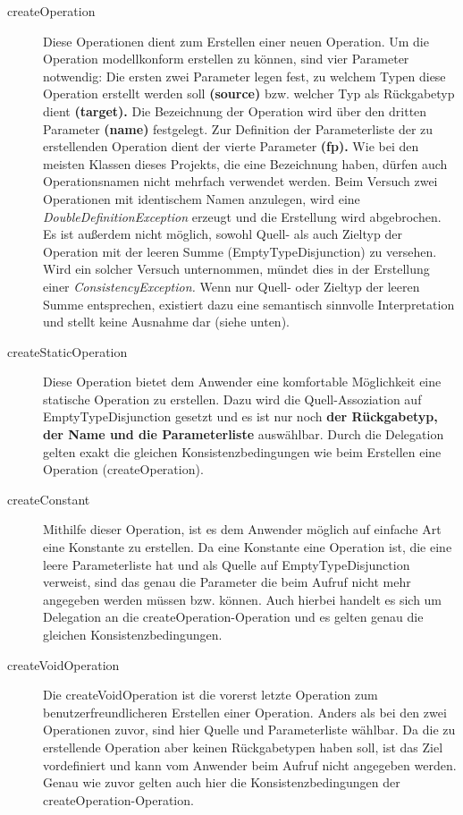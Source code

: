 \begin{description}
\item[createOperation]
Diese Operationen dient zum Erstellen einer neuen Operation. Um die Operation modellkonform erstellen zu können, sind vier Parameter notwendig:
Die ersten zwei Parameter legen fest, zu welchem Typen diese Operation erstellt werden soll \textbf{(source)} bzw. welcher Typ als Rückgabetyp dient \textbf{(target).}
Die Bezeichnung der Operation wird über den dritten Parameter \textbf{(name)} festgelegt. 
Zur Definition der Parameterliste der zu erstellenden Operation dient der vierte Parameter \textbf{(fp).}
Wie bei den meisten Klassen dieses Projekts, die eine Bezeichnung haben, dürfen auch Operationsnamen nicht mehrfach verwendet werden. Beim Versuch zwei Operationen mit identischem Namen anzulegen, wird eine \emph{DoubleDefinitionException} erzeugt und die Erstellung wird abgebrochen. Es ist außerdem nicht möglich, sowohl Quell- als auch Zieltyp der Operation mit der leeren Summe (EmptyTypeDisjunction) zu versehen. Wird ein solcher Versuch unternommen, mündet dies in der Erstellung einer \emph{ConsistencyException.} Wenn nur Quell- oder Zieltyp der leeren Summe entsprechen, existiert dazu eine semantisch sinnvolle Interpretation und stellt keine Ausnahme dar (siehe unten).
\item[createStaticOperation]
Diese Operation bietet dem Anwender eine komfortable Möglichkeit eine statische Operation zu erstellen. Dazu wird die Quell-Assoziation auf EmptyTypeDisjunction gesetzt und es ist nur noch \textbf{der Rückgabetyp, der Name und die Parameterliste} auswählbar. Durch die Delegation gelten exakt die gleichen Konsistenzbedingungen wie beim Erstellen eine Operation (createOperation).
\item[createConstant]
Mithilfe dieser Operation, ist es dem Anwender möglich auf einfache Art eine Konstante zu erstellen. Da eine Konstante eine Operation ist, die eine leere Parameterliste hat und als Quelle auf EmptyTypeDisjunction verweist, sind das genau die Parameter die beim Aufruf nicht mehr angegeben werden müssen bzw. können. Auch hierbei handelt es sich um Delegation an die createOperation-Operation und es gelten genau die gleichen Konsistenzbedingungen.
\item[createVoidOperation]
Die createVoidOperation ist die vorerst letzte Operation zum benutzerfreundlicheren Erstellen einer Operation. Anders als bei den zwei Operationen zuvor, sind hier Quelle und Parameterliste wählbar. Da die zu erstellende Operation aber keinen Rückgabetypen haben soll, ist das Ziel vordefiniert und kann vom Anwender beim Aufruf nicht angegeben werden. Genau wie zuvor gelten auch hier die Konsistenzbedingungen der createOperation-Operation.

\end{description}
